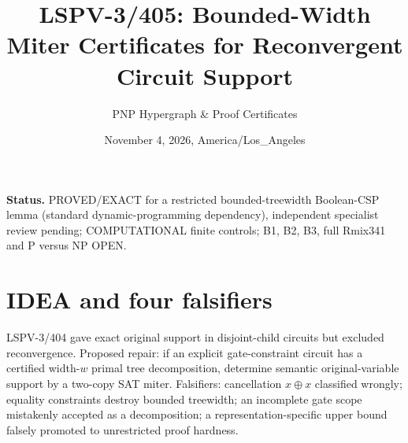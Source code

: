 \documentclass[11pt]{article}
\title{LSPV-3/405: Bounded-Width Miter Certificates for Reconvergent Circuit Support}
\author{PNP Hypergraph \& Proof Certificates}
\date{November 4, 2026, America/Los\_Angeles}
\begin{document}
\maketitle
\noindent\textbf{Status.} PROVED/EXACT for a restricted bounded-treewidth Boolean-CSP lemma (standard dynamic-programming dependency), independent specialist review pending; COMPUTATIONAL finite controls; B1, B2, B3, full Rmix341 and P versus NP OPEN.

\section*{IDEA and four falsifiers}
LSPV-3/404 gave exact original support in disjoint-child circuits but excluded reconvergence. Proposed repair: if an explicit gate-constraint circuit has a certified width-$w$ primal tree decomposition, determine semantic original-variable support by a two-copy SAT miter. Falsifiers: cancellation $x\oplus x$ classified wrongly; equality constraints destroy bounded treewidth; an incomplete gate scope mistakenly accepted as a decomposition; a representation-specific upper bound falsely promoted to unrestricted proof hardness.
\end{document}
